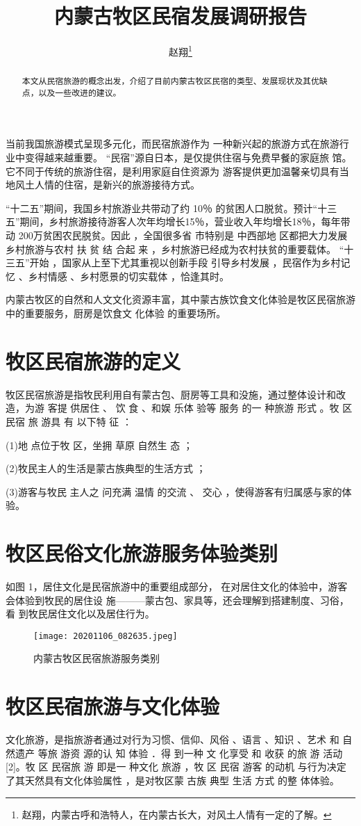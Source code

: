 \documentclass[UTF8]{ctexart}
\title{内蒙古牧区民宿发展调研报告}
\author{赵翔\footnote{赵翔，内蒙古呼和浩特人，在内蒙古长大，对风土人情有一定的了解。}}
\begin{document}
\maketitle
\begin{abstract}
本文从民宿旅游的概念出发，介绍了目前内蒙古牧区民宿的类型、发展现状及其优缺点，以及一些改进的建议。
\end{abstract}

当前我国旅游模式呈现多元化，而民宿旅游作为 一种新兴起的旅游方式在旅游行业中变得越来越重要。
“民宿”源自日本，是仅提供住宿与免费早餐的家庭旅 馆。它不同于传统的旅游住宿，是利用家庭自住资源为 游客提供更加温馨亲切具有当地风土人情的住宿，是新兴的旅游接待方式。

“十二五”期间，我国乡村旅游业共带动了约 10％ 的贫困人口脱贫。预计“十三五”期间，乡村旅游接待游客人次年均增长15％，营业收入年均增长18％，每年带动 200万贫困农民脱贫。因此 ，全国很多省 市特别是 中西部地 区都把大力发展乡村旅游与农村 扶 贫 结 合起 来 ，乡村旅游已经成为农村扶贫的重要载体。 “十三五”开始 ，国家从上至下尤其重视以创新手段 引导乡村发展 ，民宿作为乡村记忆 、乡村情感 、乡村愿景的切实载体 ，恰逢其时。

内蒙古牧区的自然和人文文化资源丰富，其中蒙古族饮食文化体验是牧区民宿旅游中的重要服务，厨房是饮食文 化体验 的重要场所。

\section{牧区民宿旅游的定义}
牧区民宿旅游是指牧民利用自有蒙古包、厨房等工具和没施，通过整体设计和改造，为游 客提 供居住 、 饮 食 、和娱 乐体 验等 服务 的一 种旅游 形式 。牧 区 民宿 旅 游具 有 以下特 征 ：
 
(1)地 点位于牧 区，坐拥 草原 自然生 态 ； 

(2)牧民主人的生活是蒙古族典型的生活方式 ；

(3)游客与牧民 主人之 问充满 温情 的交流 、 交心 ，使得游客有归属感与家的体验。
\section{牧区民俗文化旅游服务体验类别}
如图 1，居住文化是民宿旅游中的重要组成部分， 在对居住文化的体验中，游客会体验到牧民的居住设
施———蒙古包、家具等，还会理解到搭建制度、习俗，看 到牧民居住文化以及居住行为。
\begin{figure}[H]
    \centering
    \texttt{[image: 20201106\_082635.jpeg]}
    \caption{内蒙古牧区民宿旅游服务类别}
    \label{fig:my_label}
\end{figure}
\section{牧区民宿旅游与文化体验}
文化旅游，是指旅游者通过对行为习惯、信仰、风俗 、语言 、知识 、艺术 和 自然遗产 等旅 游资 源的认 知 体验 ．得 到一种 文 化享受 和 收获 的旅 游 活动[2]。牧 区 民宿旅 游 即是一 种文化 旅游 ，牧 区 民宿 游客 的动机 与行为决定了其天然具有文化体验属性 ，是对牧区蒙 古族 典型 生活 方式 的整 体体验。
\end{document}
